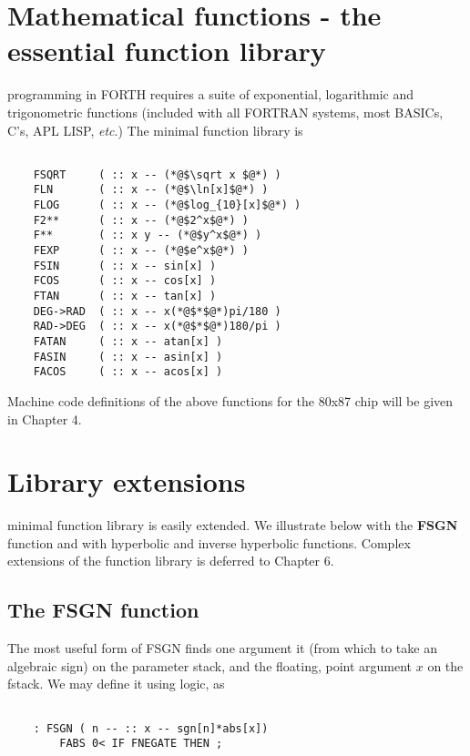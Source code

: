 \section{Mathematical functions - the essential function library}

 programming in FORTH requires a suite of exponential,
logarithmic and trigonometric functions (included with all
FORTRAN systems, most BASICs, C's, APL LISP, \textit{etc}.) The
minimal function library is

\begin{lstlisting}

    FSQRT     ( :: x -- (*@$\sqrt x $@*) )
    FLN       ( :: x -- (*@$\ln[x]$@*) )
    FLOG      ( :: x -- (*@$log_{10}[x]$@*) )
    F2**      ( :: x -- (*@$2^x$@*) )
    F**       ( :: x y -- (*@$y^x$@*) )
    FEXP      ( :: x -- (*@$e^x$@*) )
    FSIN      ( :: x -- sin[x] )
    FCOS      ( :: x -- cos[x] )
    FTAN      ( :: x -- tan[x] )
    DEG->RAD  ( :: x -- x(*@$*$@*)pi/180 )
    RAD->DEG  ( :: x -- x(*@$*$@*)180/pi )
    FATAN     ( :: x -- atan[x] )
    FASIN     ( :: x -- asin[x] )
    FACOS     ( :: x -- acos[x] )

\end{lstlisting}

Machine code definitions of the above functions for the 80x87
chip will be given in Chapter 4.

\section{Library extensions}

 minimal function library is easily extended. We illustrate
below with the \textbf{FSGN} function and with hyperbolic and inverse hyperbolic
functions. Complex extensions of the function
library is deferred to Chapter 6.

\subsection{The FSGN function}
The most useful form of FSGN finds one argument it (from which
to take an algebraic sign) on the parameter stack, and the floating,
point argument $x$ on the fstack. We may define it using logic, as
\begin{verbatim}

    : FSGN ( n -- :: x -- sgn[n]*abs[x])
        FABS 0< IF FNEGATE THEN ;
\end{verbatim}

